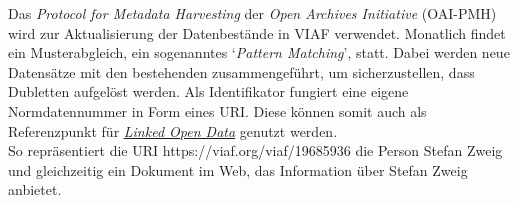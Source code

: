 \documentclass{article}
\begin{document}
        Das \emph{Protocol for Metadata Harvesting} der \emph{Open Archives Initiative} (OAI-PMH) wird zur Aktualisierung der Datenbestände in VIAF verwendet. Monatlich findet ein Musterabgleich, ein sogenanntes ‘\emph{Pattern Matching}’, statt. Dabei werden neue Datensätze mit den bestehenden zusammengeführt, um sicherzustellen, dass Dubletten aufgelöst werden. Als Identifikator fungiert eine eigene Normdatennummer in Form eines URI. Diese können somit auch als Referenzpunkt für \emph{\href{http://gams.uni-graz.at/o:konde.8}{Linked Open Data}} genutzt werden.\\
            
        So repräsentiert die URI https://viaf.org/viaf/19685936 die Person Stefan Zweig und gleichzeitig ein Dokument im Web, das Information über Stefan Zweig anbietet.  \\
            
\end{document}
